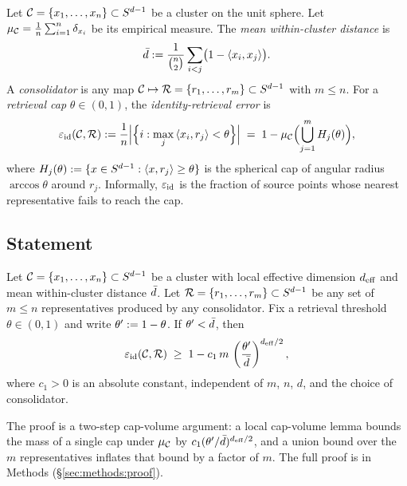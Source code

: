 Let $\mathcal{C} = \{x_1, \ldots, x_n\} \subset S^{d-1}$ be a cluster on
the unit sphere. Let $\mu_{\mathcal{C}} = \tfrac{1}{n} \sum_{i=1}^n
\delta_{x_i}$ be its empirical measure. The \emph{mean within-cluster
distance} is
\begin{equation}
\bar{d} := \frac{1}{\binom{n}{2}} \sum_{i<j}\bigl(1 - \left\langle x_i,x_j\right\rangle\bigr).
\label{eq:dbar_def}
\end{equation}
A \emph{consolidator} is any map $\mathcal{C} \mapsto \mathcal{R} = \{r_1,
\ldots, r_m\} \subset S^{d-1}$ with $m \leq n$. For a \emph{retrieval
cap} $\theta \in (0, 1)$, the \emph{identity-retrieval error} is
\begin{equation}
\varepsilon_{\mathrm{id}}(\mathcal{C}, \mathcal{R}) :=
\frac{1}{n} \Bigl|\Bigl\{i : \max_j \left\langle x_i,r_j\right\rangle < \theta \Bigr\}\Bigr|
\;=\; 1 - \mu_{\mathcal{C}}\Bigl(\bigcup_{j=1}^m H_j(\theta)\Bigr),
\label{eq:id_error_def}
\end{equation}
where $H_j(\theta) := \{x \in S^{d-1} : \left\langle x,r_j\right\rangle \geq \theta\}$ is
the spherical cap of angular radius $\arccos\theta$ around $r_j$.
Informally, $\varepsilon_{\mathrm{id}}$ is the fraction of source points whose
nearest representative fails to reach the cap.

\subsection{Statement}

\begin{theorem}
\label{thm:duality}
Let $\mathcal{C} = \{x_1, \ldots, x_n\} \subset S^{d-1}$ be a cluster
with local effective dimension ${d_{\mathrm{eff}}}$ and mean within-cluster distance
$\bar{d}$. Let $\mathcal{R} = \{r_1, \ldots, r_m\} \subset S^{d-1}$ be any set
of $m \leq n$ representatives produced by any consolidator. Fix a
retrieval threshold $\theta \in (0,1)$ and write $\theta' := 1 - \theta$.
If $\theta' < \bar{d}$, then
\begin{equation}
\varepsilon_{\mathrm{id}}(\mathcal{C}, \mathcal{R})
\;\geq\; 1 - c_1\, m\, \left(\frac{\theta'}{\bar{d}}\right)^{{d_{\mathrm{eff}}}/2},
\label{eq:duality_bound}
\end{equation}
where $c_1 > 0$ is an absolute constant, independent of $m$, $n$, $d$, and
the choice of consolidator.
\end{theorem}

The proof is a two-step cap-volume argument: a local cap-volume lemma
bounds the mass of a single cap under $\mu_{\mathcal{C}}$ by $c_1
(\theta'/\bar{d})^{{d_{\mathrm{eff}}}/2}$, and a union bound over the $m$ representatives
inflates that bound by a factor of $m$. The full proof is in
Methods (\S\ref{sec:methods:proof}).

